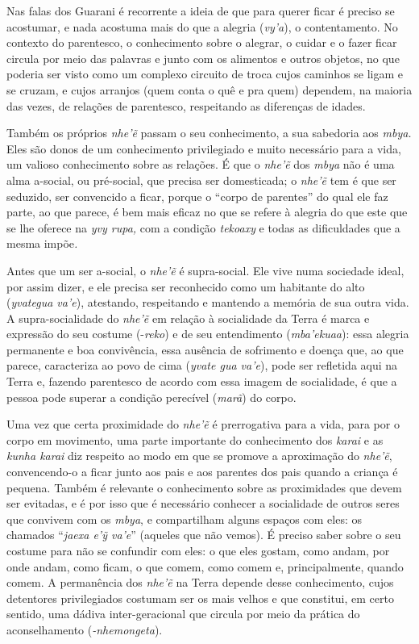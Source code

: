 Nas falas dos Guarani é recorrente a ideia de que para querer ficar é
preciso se acostumar, e nada acostuma mais do que a alegria
(\emph{vy'a}), o contentamento. No contexto do parentesco, o
conhecimento sobre o alegrar, o cuidar e o fazer ficar circula por meio
das palavras e junto com os alimentos e outros objetos, no que poderia
ser visto como um complexo circuito de troca cujos caminhos se ligam e
se cruzam, e cujos arranjos (quem conta o quê e pra quem) dependem, na
maioria das vezes, de relações de parentesco, respeitando as diferenças
de idades.

Também os próprios \emph{nhe'ẽ} passam o seu conhecimento, a sua
sabedoria aos \emph{mbya.} Eles são donos de um conhecimento
privilegiado e muito necessário para a vida, um valioso conhecimento
sobre as relações. É que o \emph{nhe'ẽ} dos \emph{mbya} não é uma alma
a-social, ou pré-social, que precisa ser domesticada; o \emph{nhe'ẽ} tem
é que ser seduzido, ser convencido a ficar, porque o ``corpo de
parentes'' do qual ele faz parte, ao que parece, é bem mais eficaz no
que se refere à alegria do que este que se lhe oferece na \emph{yvy
rupa,} com a condição \emph{tekoaxy} e todas as dificuldades que a mesma
impõe\emph{.}

Antes que um ser a-social, o \emph{nhe'ẽ} é supra-social. Ele vive numa
sociedade ideal, por assim dizer, e ele precisa ser reconhecido como um
habitante do alto (\emph{yvategua va'e}), atestando, respeitando e
mantendo a memória de sua outra vida. A supra-socialidade do
\emph{nhe'ẽ} em relação à socialidade da Terra é marca e expressão do
seu costume (-\emph{reko}) e de seu entendimento (\emph{mba'ekuaa}):
essa alegria permanente e boa convivência, essa ausência de sofrimento e
doença que, ao que parece, caracteriza ao povo de cima (\emph{yvate gua
va'e}), pode ser refletida aqui na Terra e, fazendo parentesco de acordo
com essa imagem de socialidade, é que a pessoa pode superar a condição
perecível (\emph{marã}) do corpo.

Uma vez que certa proximidade do \emph{nhe'ẽ} é prerrogativa para a
vida, para por o corpo em movimento, uma parte importante do
conhecimento dos \emph{karai} e as \emph{kunha karai} diz respeito ao
modo em que se promove a aproximação do \emph{nhe'ẽ}, convencendo-o a
ficar junto aos pais e aos parentes dos pais quando a criança é pequena.
\protect\hypertarget{OLE_LINK14}{}{\protect\hypertarget{OLE_LINK13}{}{}}Também
é relevante o conhecimento sobre as proximidades que devem ser evitadas,
e é por isso que é necessário conhecer a socialidade de outros seres que
convivem com os \emph{mbya}, e compartilham alguns espaços com eles: os
chamados ``\emph{jaexa e'ỹ va'e}'' (aqueles que não vemos). É preciso
saber sobre o seu costume para não se confundir com eles: o que eles
gostam, como andam, por onde andam, como ficam, o que comem, como comem
e, principalmente, quando comem. A permanência dos \emph{nhe'ẽ} na Terra
depende desse conhecimento, cujos detentores privilegiados costumam ser
os mais velhos e que constitui, em certo sentido, uma dádiva
inter-geracional que circula por meio da prática do aconselhamento
(\emph{-nhemongeta}).

